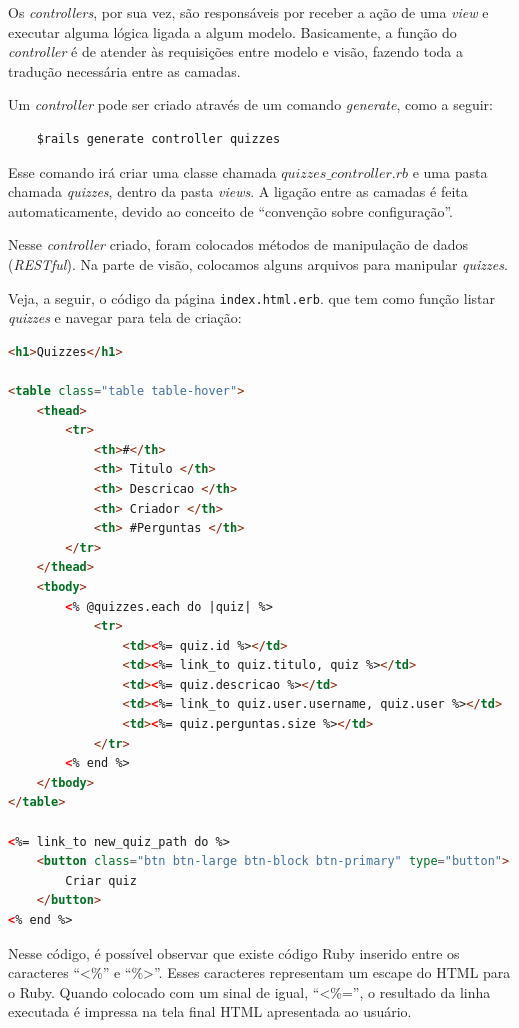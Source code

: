             Os \emph{controllers}, por sua vez, são responsáveis por receber a ação de uma \emph{view} e executar alguma lógica ligada a algum modelo. Basicamente, a função do \emph{controller} é de atender às requisições entre modelo e visão, fazendo toda a tradução necessária entre as camadas.
			
            Um \emph{controller} pode ser criado através de um comando \emph{generate}, como a seguir:
	\begin{lstlisting}
    $rails generate controller quizzes
    \end{lstlisting} 
            Esse comando irá criar uma classe chamada $quizzes\_controller.rb$ e uma pasta chamada \emph{quizzes}, dentro da pasta \emph{views}. A ligação entre as camadas é feita automaticamente, devido ao conceito de ``convenção sobre configuração''.
			
            Nesse \emph{controller} criado, foram colocados métodos de manipulação de dados (\emph{RESTful}). Na parte de visão, colocamos alguns arquivos para manipular \emph{quizzes}.  
			
            Veja, a seguir, o código da página \texttt{index.html.erb}. que tem como função listar \emph{quizzes} e navegar para tela de criação:
\begin{lstlisting}[language=HTML]
<h1>Quizzes</h1>
     
<table class="table table-hover">
    <thead>
        <tr>
            <th>#</th>
            <th> Titulo </th>
            <th> Descricao </th>
            <th> Criador </th>
            <th> #Perguntas </th>
        </tr>
    </thead>
    <tbody>
        <% @quizzes.each do |quiz| %>
            <tr>
                <td><%= quiz.id %></td>
                <td><%= link_to quiz.titulo, quiz %></td>
                <td><%= quiz.descricao %></td>
                <td><%= link_to quiz.user.username, quiz.user %></td>
                <td><%= quiz.perguntas.size %></td>
            </tr>
        <% end %>
    </tbody>
</table>
     
<%= link_to new_quiz_path do %>
    <button class="btn btn-large btn-block btn-primary" type="button">
        Criar quiz
    </button>
<% end %>
 \end{lstlisting} 
 
             Nesse código, é possível observar que existe código Ruby inserido entre os caracteres ``<\%'' e ``\%>''. Esses caracteres representam um escape do \ac{HTML} para  o Ruby. Quando colocado com um sinal de igual, ``<\%='', o resultado da linha executada é impressa na tela final \ac{HTML} apresentada ao usuário.
			 

